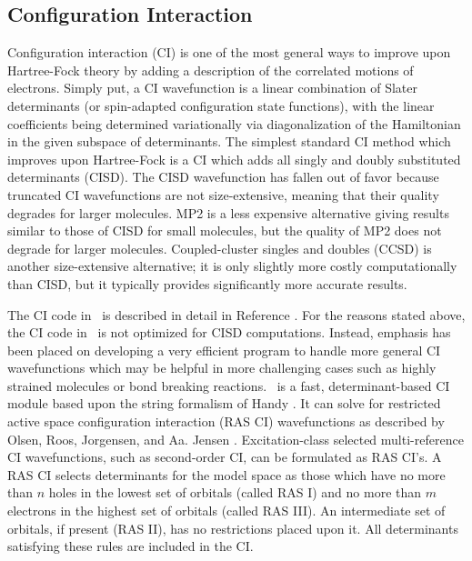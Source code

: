 \subsection{Configuration Interaction} \label{detci}

Configuration interaction (CI) is one of the most general ways to
improve upon Hartree-Fock theory by adding a description of the
correlated motions of electrons.  Simply put, a CI wavefunction
is a linear combination of Slater determinants (or spin-adapted
configuration state functions), with the linear coefficients being
determined variationally via diagonalization of the Hamiltonian in the
given subspace of determinants.  The simplest standard CI method which
improves upon Hartree-Fock is a CI which adds all singly and doubly
substituted determinants (CISD).  The CISD wavefunction has fallen out
of favor because truncated CI wavefunctions are not size-extensive,
meaning that their quality degrades for larger molecules.  MP2 is a less
expensive alternative giving results similar to those of CISD for small
molecules, but the quality of MP2 does not degrade for larger molecules.
Coupled-cluster singles and doubles (CCSD) is another size-extensive
alternative; it is only slightly more costly computationally than CISD,
but it typically provides significantly more accurate results.

The CI code in \PSIfour\ is described in detail in Reference
\cite{Sherrill:1999:CI}.  For the reasons stated above, the CI code in
\PSIfour\ is not optimized for CISD computations.  Instead, emphasis
has been placed on developing a very efficient program to handle more
general CI wavefunctions which may be helpful in more challenging cases
such as highly strained molecules or bond breaking reactions.  \PSIdetci\
is a fast, determinant-based CI module based upon the string formalism
of Handy \cite{Handy:1980}.  It can solve for restricted active space
configuration interaction (RAS CI) wavefunctions as described by Olsen,
Roos, Jorgensen, and Aa. Jensen \cite{Olsen:1988}.  Excitation-class
selected multi-reference CI wavefunctions, such as second-order CI,
can be formulated as RAS CI's.  A RAS CI selects determinants for the
model space as those which have no more than $n$ holes in the lowest set
of orbitals (called RAS I) and no more than $m$ electrons in the highest
set of orbitals (called RAS III).  An intermediate set of orbitals, if
present (RAS II), has no restrictions placed upon it.  All determinants
satisfying these rules are included in the CI.

